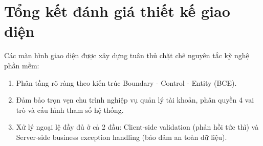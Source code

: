 \documentclass[12pt,a4paper]{report}
\begin{document}
\section{Tổng kết đánh giá thiết kế giao diện}
Các màn hình giao diện được xây dựng tuân thủ chặt chẽ nguyên tắc kỹ nghệ phần mềm:
\begin{enumerate}
    \item Phân tầng rõ ràng theo kiến trúc Boundary - Control - Entity (BCE).
    \item Đảm bảo trọn vẹn chu trình nghiệp vụ quản lý tài khoản, phân quyền 4 vai trò và cấu hình tham số hệ thống.
    \item Xử lý ngoại lệ đầy đủ ở cả 2 đầu: Client-side validation (phản hồi tức thì) và Server-side business exception handling (bảo đảm an toàn dữ liệu).
\end{enumerate}
\end{document}
